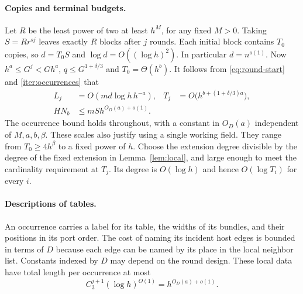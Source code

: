\paragraph{Copies and terminal budgets.}
Let $R$ be the least power of two at least $h^M$, for any fixed $M>0$.
Taking $S=Rr^{sj}$ leaves exactly $R$ blocks after $j$ rounds.
Each initial block contains $T_0$ copies, so $d=T_0S$ and
$\log d=O((\log h)^2)$. In particular $d=n^{o(1)}$.
Now $h^a\le G^j<Gh^a$, $q\le G^{1+\delta/3}$ and $T_0=\Theta(h^b)$.
It follows from \eqref{eq:round-start} and \eqref{iter:occurrences} that
\begin{equation}
 \begin{aligned}
 L_j&=O(md\log h\,h^{-a}),&
 T_j&=O\bigl(h^{b+(1+\delta/3)a}\bigr),\\
 HN_b&\le mS h^{O_D(a)+o(1)} .
 \end{aligned}
 \label{eq:round-terminal}
\end{equation}
The occurrence bound holds throughout, with a constant in $O_D(a)$
independent of $M,a,b,\beta$. These scales also justify using a single
working field. They range from $T_0\ge4h^\beta$ to a fixed power of
$h$. Choose the extension degree divisible by the degree of the fixed
extension in Lemma~\ref{lem:local}, and large enough to meet the
cardinality requirement at $T_j$. Its degree is $O(\log h)$ and hence
$O(\log T_i)$ for every $i$.

\paragraph{Descriptions of tables.}
An occurrence carries a label for its table, the widths of its bundles,
and their positions in its port order. The cost of naming its
incident host edges is bounded in terms of $D$ because each edge can
be named by its place in the local neighbor list. Constants indexed by $D$ may depend on the round design. These local data have total length per occurrence at most
\begin{equation}
 C_3^{j+1}(\log h)^{O(1)}
   =h^{O_D(a)+o(1)} .
 \label{iter:labels}
\end{equation}

